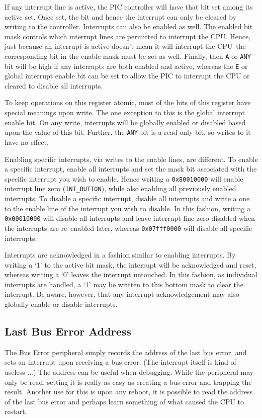 \documentclass{gqtekspec}
\begin{document}
If any interrupt line is active, the PIC controller
will have that bit set among its active set.  Once set, the bit and hence the
interrupt can only be cleared by writing to the controller.  Interrupts can 
also be enabled as well.  The enabled bit mask controls which interrupt lines
are permitted to interrupt the CPU. Hence, just because an interrupt is active
doesn't mean it will interrupt the CPU--the corresponding bit in the enable
mask must be set as well.
Finally, then {\tt A} or {\tt ANY} bit will be high if any interrupts are both
enabled and active, whereas the {\tt E} or global interrupt enable bit can be
set to allow the PIC to interrupt the CPU or cleared to disable all interrupts.

To keep operations on this register atomic, most of the bits of this register
have special meanings upon write.  The one exception to this is the global
interrupt enable bit.  On any write, interrupts will be globally enabled or
disabled based upon the value of this bit.  Further, the {\tt ANY} bit is a 
read only bit, so writes to it have no effect.

Enabling specific interrupts, via writes to the enable lines, are different.
To enable a specific interrupt, enable all interrupts and
set the mask bit associated with the specific interrupt you wish to enable.
Hence writing a {\tt 0x80010000} will enable interrupt line zero
({\tt INT\_BUTTON}), while also enabling all previously enabled interrupts.
To disable a specific interrupt, disable all interrupts and write a one to the
enable line of the interrupt you wish to disable.  In this fashion, writing a
{\tt 0x00010000} will disable all interrupts and leave interrupt line zero
disabled when the interrupts are re--enabled later, whereas {\tt 0x07fff0000}
will disable all specific interrupts.

Interrupts are acknowledged in a fashion similar to enabling interrupts.  By
writing a `1' to the active bit mask, the interrupt will be acknowledged and
reset, whereas writing a `0' leaves the interrupt untouched.  In this fashion,
as individual interrupts are handled, a `1' may be written to this bottom mask
to clear the interrupt.  Be aware, however, that any interrupt acknowledgement
may also globally enable or disable interrupts.

\subsection{Last Bus Error Address}
The Bus Error peripheral simply records the address of the last bus error,
and sets an interrupt upon receiving a bus error.  (The interrupt itself
is kind of useless ...) The address can be useful when debugging.  While the
peripheral may only be read,
setting it is really as easy as creating a bus error and trapping the result.
Another use for this is upon any reboot, it is possible to read the address
of the last bus error and perhaps learn something of what caused the CPU to
restart.
\end{document}
